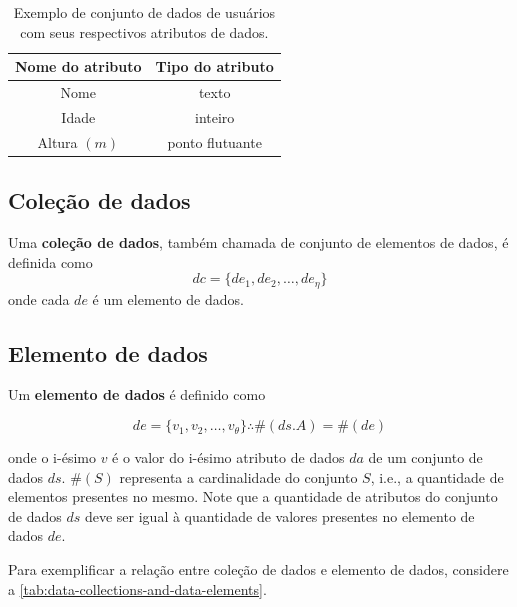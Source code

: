 \begin{table}[ht]
    \centering
    \begin{tabular}{|c|c|}
        \hline
        \textbf{Nome do atributo} & \textbf{Tipo do atributo} \\
        \hline
        Nome             & texto           \\
        \hline
        Idade            & inteiro         \\
        \hline
        Altura \( (m) \) & ponto flutuante \\
        \hline
    \end{tabular}
    \caption[Exemplo de conjunto de dados com seus atributos de dados]{Exemplo de conjunto de dados de usuários com seus respectivos atributos de dados.}%
    \label{tab:dataset-attributes-example}
\end{table}

\subsection{Coleção de dados}

Uma \textbf{coleção de dados}, também chamada de conjunto de elementos de dados, é definida como \[ dc = \{ de_1, de_2, \ldots, de_{\eta} \} \] onde cada \( de \) é um elemento de dados.

\subsection{Elemento de dados}

Um \textbf{elemento de dados} é definido como

\[ de = \{ v_1, v_2, \ldots, v_{\theta} \} \therefore \#(ds.A) = \#(de) \]

onde o i-ésimo \( v \) é o valor do i-ésimo atributo de dados \( da \) de um conjunto de dados \( ds \). \( \#(S) \) representa a cardinalidade do conjunto \( S \), i.e., a quantidade de elementos presentes no mesmo. Note que a quantidade de atributos do conjunto de dados \( ds \) deve ser igual à quantidade de valores presentes no elemento de dados \( de \).

Para exemplificar a relação entre coleção de dados e elemento de dados, considere a \autoref{tab:data-collections-and-data-elements}.

